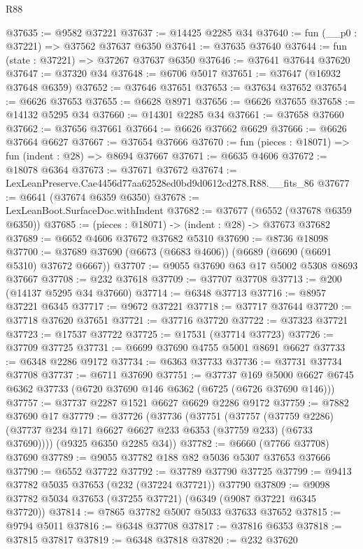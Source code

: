 \begin{lexlean}{R88}
\begin{coremodule}
@37635 := @9582 @37221
@37637 := @14425 @2285 @34
@37640 := fun (__p0 : @37221) => @37562 @37637 @6350
@37641 := @37635 @37640
@37644 := fun (state : @37221) => @37267 @37637 @6350
@37646 := @37641 @37644 @37620
@37647 := @37320 @34
@37648 := @6706 @5017
@37651 := @37647 (@16932 @37648 @6359)
@37652 := @37646 @37651
@37653 := @37634 @37652
@37654 := @6626 @37653
@37655 := @6628 @8971
@37656 := @6626 @37655
@37658 := @14132 @5295 @34
@37660 := @14301 @2285 @34
@37661 := @37658 @37660
@37662 := @37656 @37661
@37664 := @6626 @37662 @6629
@37666 := @6626 @37664 @6627
@37667 := @37654 @37666
@37670 := fun (pieces : @18071) => fun (indent : @28) => @8694 @37667
@37671 := @6635 @4606
@37672 := @18078 @6364
@37673 := @37671 @37672
@37674 := LexLeanPreserve.Cae4456d77aa62528ed0bd9d0612cd278.R88.__fits_86
@37677 := @6641 (@37674 @6359 @6350)
@37678 := LexLeanBoot.SurfaceDoc.withIndent
@37682 := @37677 (@6552 (@37678 @6359 @6350))
@37685 := (pieces : @18071) -> (indent : @28) -> @37673 @37682
@37689 := @6652 @4606 @37672 @37682 @5310
@37690 := @8736 @18098
@37700 := @37689 @37690 (@6673 (@6683 @4606)) (@6689 (@6690 (@6691 @5310) @37672 @6667))
@37707 := @9055 @37690 @63 @17 @5002 @5308 @8693 @37667
@37708 := @232 @37618
@37709 := @37707 @37708
@37713 := @200 (@14137 @5295 @34 @37660)
@37714 := @6348 @37713
@37716 := @8957 @37221 @6345
@37717 := @9672 @37221
@37718 := @37717 @37644
@37720 := @37718 @37620 @37651
@37721 := @37716 @37720
@37722 := @37323 @37721
@37723 := @17537 @37722
@37725 := @17531 (@37714 @37723)
@37726 := @37709 @37725
@37731 := @6699 @37690 @4755 @5001 @8691 @6627
@37733 := @6348 @2286 @9172
@37734 := @6363 @37733
@37736 := @37731 @37734 @37708
@37737 := @6711 @37690
@37751 := @37737
    @169
    @5000
    @6627
    @6745
    @6362
    @37733
    (@6720 @37690 @146 @6362 (@6725 (@6726 @37690 @146)))
@37757 := @37737 @2287 @1521 @6627 @6629 @2286 @9172
@37759 := @7882 @37690 @17
@37779 := @37726
    (@37736
      (@37751
        (@37757
          (@37759 @2286)
          (@37737 @234 @171 @6627 @6627 @233 @6353 (@37759 @233) (@6733 @37690))))
      (@9325 @6350 @2285 @34))
@37782 := @6660 (@7766 @37708) @37690
@37789 := @9055 @37782 @188 @82 @5036 @5307 @37653 @37666
@37790 := @6552 @37722
@37792 := @37789 @37790 @37725
@37799 := @9413 @37782 @5035 @37653 (@232 (@37224 @37721)) @37790
@37809 := @9098 @37782 @5034 @37653 (@37255 @37721) (@6349 (@9087 @37221 @6345 @37720))
@37814 := @7865 @37782 @5007 @5033 @37633 @37652
@37815 := @9794 @5011
@37816 := @6348 @37708
@37817 := @37816 @6353
@37818 := @37815 @37817
@37819 := @6348 @37818
@37820 := @232 @37620

\end{coremodule}
\end{lexlean}
